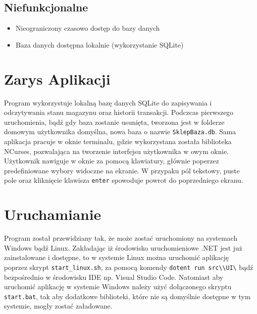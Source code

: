 \documentclass[12pt,a4paper]{article}
\begin{document}
	\subsection{Niefunkcjonalne}
	\begin{itemize}
		\item Nieograniczony czasowo dostęp do bazy danych
		\item Baza danych dostępna lokalnie (wykorzystanie SQLite)
	\end{itemize}
\newpage

\section{Zarys Aplikacji}
Program wykorzystuje lokalną bazę danych SQLite do zapisywania i odczytywania stanu magazynu oraz historii transakcji. Podczcas pierwszego uruchomienia, bądź gdy baza zostanie usunięta, tworzona jest w folderze domowym użytkownika domyślna, nowa baza o nazwie \verb|SklepBaza.db|. Sama aplikacja pracuje w oknie terminalu, gdzie wykorzystana została biblioteka NCurses, pozwalająca na tworzenie interfejsu użytkownika w owym oknie. Użytkownik nawiguje w oknie za pomocą klawiatury, głównie poperzez predefiniowane wybory widoczne na ekranie. W przypaku pól tekstowy, puste pole oraz kliknięcie klawisza \verb|enter| spowoduje powrot do poprzedniego ekranu.

\section{Uruchamianie}
Program został przewidziany tak, że może zostać uruchomiony na systemach Windows bądź Linux. Zakładając iż środowisko uruchomieniowe .NET jest już zainstalowane i dostępne, to w systemie Linux można uruchomić aplikację poprzez skrypt \verb|start_linux.sh|, za pomocą komendy \verb|dotent run src\\UI\| bądź bezpośrednio w środowisku IDE np. Visual Studio Code. Natomiast aby uruchomić aplikację w systemie Windows należy użyć dołączonego skryptu \verb|start.bat|, tak aby dodatkowe biblioteki, które nie są domyślnie dostępne w tym systemie, mogły zostać załadowane.
\newpage
\end{document}
